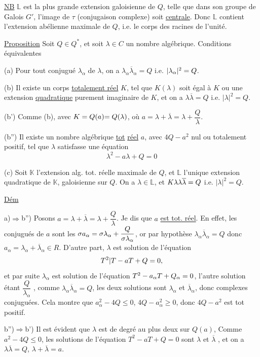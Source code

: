 \uline{NB} $\mathbb L$ est la plus grande extension galoisienne de $Q$, telle que dans son groupe de Galois $G'$, l'image de $\tau$ (conjugaison complexe) soit \uline{centrale}. Donc $\mathbb L$ contient l'extension abélienne maximale de $Q$, i.e. le corps des racines de l'unité.

\uline{Proposition} Soit $Q\in Q^*$, et soit $\lambda\in C$ un nombre algébrique. Conditions équivalentes

(a) Pour tout conjugué $\lambda_\alpha$ de $\lambda$, on a $\lambda_\alpha\overline\lambda_\alpha=Q$ i.e. $|\lambda_\alpha|^2={Q}$.

(b)  Il existe un corps  \uline{totalement réel} $K$, tel que  $K(\lambda)$ soit égal à $K$ ou une extension \uline{quadratique} purement imaginaire de $K$, et on a $\lambda\overline\lambda=Q$ i.e. $|\lambda|^2=Q$.

(b') Comme (b), avec $K=Q(a){{=Q(\lambda)}}$, où $a=\lambda+\overline\lambda=\lambda+\dfrac Q\lambda$.

(b'') Il existe un nombre algébrique  \uline{tot} \uline{réel} $a$, avec  $4Q-a^2$ nul ou totalement positif, tel que $\lambda$ satisfasse une équation
\[
\lambda^2-a\lambda+Q=0
\]

(c) Soit $\mathbb K$ l'extension alg. tot. réelle maximale de $Q$, et $\mathbb L$ l'unique extension quadratique de $\mathbb K$, galoisienne sur $Q$. On a $\lambda\in\mathbb L$, et ${{K\lambda}}\lambda\overline\lambda=Q$ i.e. $|\lambda|^2=Q$.

\uline{Dém}

a)$\Longrightarrow$b'') Posons $a=\lambda+\overline\lambda=\lambda+\dfrac Q\lambda$. Je dis que $a$ \uline{est tot. réel}. En effet, les conjugués de $a$ sont les ${{\sigma}}a_\alpha={{\sigma}}\lambda_\alpha+\dfrac Q{{{\sigma}}\lambda_\alpha}$, or par hypothèse $\lambda_\alpha\overline\lambda_\alpha=Q$ donc $a_\alpha=\lambda_\alpha+\overline\lambda_\alpha\in R$. D'autre part, $\lambda$ est solution de l'équation
\[
{T^2|T}-aT+Q=0,
\]
et par suite $\lambda_\alpha$ est solution de l'équation $T^2-a_\alpha T+Q_{{\alpha}}=0$,  l'autre solution étant $\dfrac Q{\lambda_\alpha}$ ,  comme $\lambda_\alpha\overline\lambda_\alpha=Q$, les deux solutions sont $\lambda_\alpha$ et $\overline\lambda_\alpha$, donc complexes conjuguées. Cela montre que $a_\alpha^2-4Q\le0$,   $4Q-a_\alpha^2\ge0$, donc $4Q-a^2$ est tot positif.

b'')$\Longrightarrow$b') Il est évident que $\lambda$ est de degré au plus deux sur  $Q(a)$,     Comme $a^2-4Q\le0$, les solutions de l'équation $T^2-aT+Q=0$ sont $\lambda$ et $\overline\lambda$ , et on a $\lambda\overline\lambda=Q$, $\lambda+\overline\lambda=a$.
